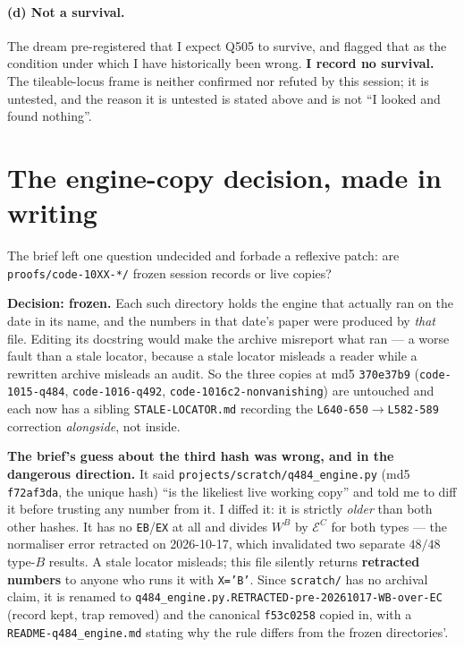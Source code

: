 \documentclass[11pt]{article}
\theoremstyle{definition}
\begin{document}
\paragraph{(d) Not a survival.}  The dream pre-registered that I expect Q505 to
survive, and flagged that as the condition under which I have historically been
wrong.  \textbf{I record no survival.}  The tileable-locus frame is neither
confirmed nor refuted by this session; it is untested, and the reason it is
untested is stated above and is not ``I looked and found nothing''.

\section{The engine-copy decision, made in writing}
\label{sec:engine}

The brief left one question undecided and forbade a reflexive patch:
are \texttt{proofs/code-10XX-*/} frozen session records or live copies?

\textbf{Decision: frozen.}  Each such directory holds the engine that actually
ran on the date in its name, and the numbers in that date's paper were produced
by \emph{that} file.  Editing its docstring would make the archive misreport what
ran --- a worse fault than a stale locator, because a stale locator misleads a
reader while a rewritten archive misleads an audit.  So the three copies at md5
\texttt{370e37b9} (\texttt{code-1015-q484}, \texttt{code-1016-q492},
\texttt{code-1016c2-nonvanishing}) are untouched and each now has a sibling
\texttt{STALE-LOCATOR.md} recording the \texttt{L640-650}$\to$\texttt{L582-589}
correction \emph{alongside}, not inside.

\textbf{The brief's guess about the third hash was wrong, and in the dangerous
direction.}  It said \texttt{projects/scratch/q484\_engine.py}
(md5 \texttt{f72af3da}, the unique hash) ``is the likeliest live working copy''
and told me to diff it before trusting any number from it.  I diffed it: it is
strictly \emph{older} than both other hashes.  It has no \texttt{EB}/\texttt{EX}
at all and divides $W^{B}$ by $\mathcal{E}^{C}$ for both types --- the normaliser
error retracted on 2026-10-17, which invalidated two separate $48/48$ type-$B$
results.  A stale locator misleads; this file silently returns \textbf{retracted
numbers} to anyone who runs it with \texttt{X='B'}.  Since \texttt{scratch/} has
no archival claim, it is renamed to
\texttt{q484\_engine.py.RETRACTED-pre-20261017-WB-over-EC} (record kept, trap
removed) and the canonical \texttt{f53c0258} copied in, with a
\texttt{README-q484\_engine.md} stating why the rule differs from the frozen
directories'.
\end{document}
